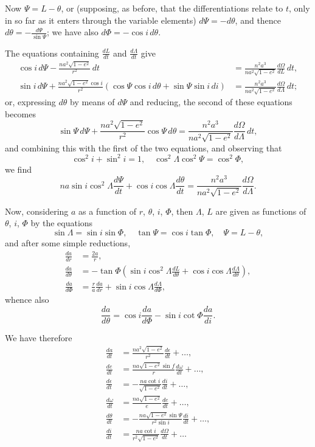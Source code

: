 \documentclass[11pt,a4paper]{book}
\begin{document}
Now $\Psi = L - \theta$, or (supposing, as before, that the differentiations relate to $t$, only in so far as it enters through the variable elements) $d\Psi = -d\theta$, and thence $d\theta = -\frac{d\Psi}{\sin\Psi}$; we have also $d\Phi = -\cos i\, d\theta$.

The equations containing $\frac{dL}{dt}$ and $\frac{d\Lambda}{dt}$ give
\begin{align*}
\cos i\, d\Psi - \frac{na^2\sqrt{1-e^2}}{r^2}\, dt &= \frac{n^2a^3}{na^2\sqrt{1-e^2}}\frac{d\Omega}{dL}\, dt, \\
\sin i\, d\Psi + \frac{na^2\sqrt{1-e^2}\cos i}{r^2}(\cos\Psi\cos i\, d\theta + \sin\Psi\sin i\, di) &= \frac{n^2a^3}{na^2\sqrt{1-e^2}}\frac{d\Omega}{d\Lambda}\, dt;
\end{align*}
or, expressing $d\theta$ by means of $d\Psi$ and reducing, the second of these equations becomes
\[
\sin\Psi\, d\Psi + \frac{na^2\sqrt{1-e^2}}{r^2}\cos\Psi\, d\theta = \frac{n^2a^3}{na^2\sqrt{1-e^2}}\frac{d\Omega}{d\Lambda}\, dt,
\]
and combining this with the first of the two equations, and observing that
\[
\cos^2 i + \sin^2 i = 1, \quad \cos^2\Lambda\cos^2\Psi = \cos^2\Phi,
\]
we find
\[
na\sin i\cos^2\Lambda\frac{d\Psi}{dt} + \cos i\cos\Lambda\frac{d\theta}{dt} = \frac{n^2a^3}{na^2\sqrt{1-e^2}}\frac{d\Omega}{d\Lambda}.
\]

Now, considering $a$ as a function of $r$, $\theta$, $i$, $\Phi$, then $\Lambda$, $L$ are given as functions of $\theta$, $i$, $\Phi$ by the equations
\[
\sin\Lambda = \sin i\sin\Phi, \quad \tan\Psi = \cos i\tan\Phi, \quad \Psi = L - \theta,
\]
and after some simple reductions,
\begin{align*}
\frac{da}{dr} &= \frac{2a}{r}, \\
\frac{da}{d\theta} &= -\tan\Phi(\sin i\cos^2\Lambda\frac{dL}{d\theta} + \cos i\cos\Lambda\frac{d\Lambda}{d\theta}), \\
\frac{da}{d\Phi} &= \frac{r}{a}\frac{da}{dr} + \sin i\cos\Lambda\frac{d\Lambda}{d\Phi},
\end{align*}
whence also
\[
\frac{da}{d\theta} = \cos i\frac{da}{d\Phi} - \sin i\cot\Phi\frac{da}{di}.
\]

We have therefore
\begin{align*}
\frac{da}{dt} &= \frac{na^2\sqrt{1-e^2}}{r^2}\frac{d\epsilon}{dt} + \ldots, \\
\frac{de}{dt} &= \frac{na\sqrt{1-e^2}\sin f}{r}\frac{d\omega}{dt} + \ldots, \\
\frac{d\epsilon}{dt} &= -\frac{na\cot i}{\sqrt{1-e^2}}\frac{di}{dt} + \ldots, \\
\frac{d\omega}{dt} &= \frac{na\sqrt{1-e^2}}{e}\frac{de}{dt} + \ldots, \\
\frac{d\theta}{dt} &= -\frac{na\sqrt{1-e^2}\sin\Psi}{r^2\sin i}\frac{di}{dt} + \ldots, \\
\frac{di}{dt} &= \frac{na\cot i}{r^2\sqrt{1-e^2}}\frac{d\Omega}{dt} + \ldots
\end{align*}
\end{document}
